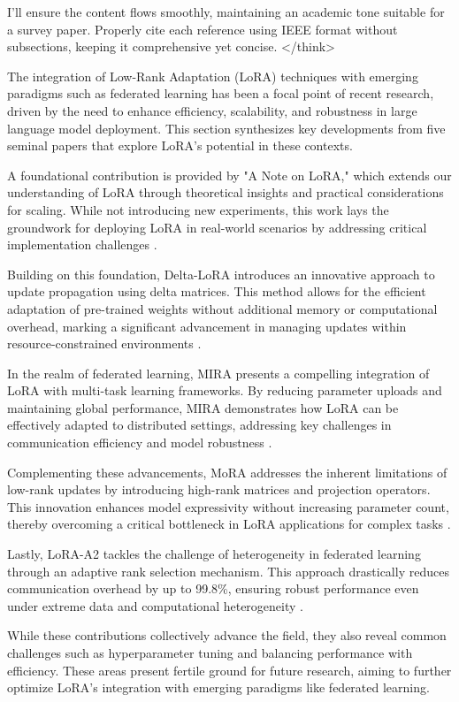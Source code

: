 \documentclass[conference]{IEEEtran}
\begin{document}
I'll ensure the content flows smoothly, maintaining an academic tone suitable for a survey paper. Properly cite each reference using IEEE format without subsections, keeping it comprehensive yet concise.
</think>

The integration of Low-Rank Adaptation (LoRA) techniques with emerging paradigms such as federated learning has been a focal point of recent research, driven by the need to enhance efficiency, scalability, and robustness in large language model deployment. This section synthesizes key developments from five seminal papers that explore LoRA's potential in these contexts.

A foundational contribution is provided by "A Note on LoRA," which extends our understanding of LoRA through theoretical insights and practical considerations for scaling. While not introducing new experiments, this work lays the groundwork for deploying LoRA in real-world scenarios by addressing critical implementation challenges \cite{aNoteOnLORA}.

Building on this foundation, Delta-LoRA introduces an innovative approach to update propagation using delta matrices. This method allows for the efficient adaptation of pre-trained weights without additional memory or computational overhead, marking a significant advancement in managing updates within resource-constrained environments \cite{deltaLORA}.

In the realm of federated learning, MIRA presents a compelling integration of LoRA with multi-task learning frameworks. By reducing parameter uploads and maintaining global performance, MIRA demonstrates how LoRA can be effectively adapted to distributed settings, addressing key challenges in communication efficiency and model robustness \cite{mira}.

Complementing these advancements, MoRA addresses the inherent limitations of low-rank updates by introducing high-rank matrices and projection operators. This innovation enhances model expressivity without increasing parameter count, thereby overcoming a critical bottleneck in LoRA applications for complex tasks \cite{mora}.

Lastly, LoRA-A2 tackles the challenge of heterogeneity in federated learning through an adaptive rank selection mechanism. This approach drastically reduces communication overhead by up to 99.8\%, ensuring robust performance even under extreme data and computational heterogeneity \cite{loraA2}.

While these contributions collectively advance the field, they also reveal common challenges such as hyperparameter tuning and balancing performance with efficiency. These areas present fertile ground for future research, aiming to further optimize LoRA's integration with emerging paradigms like federated learning.
\end{document}

